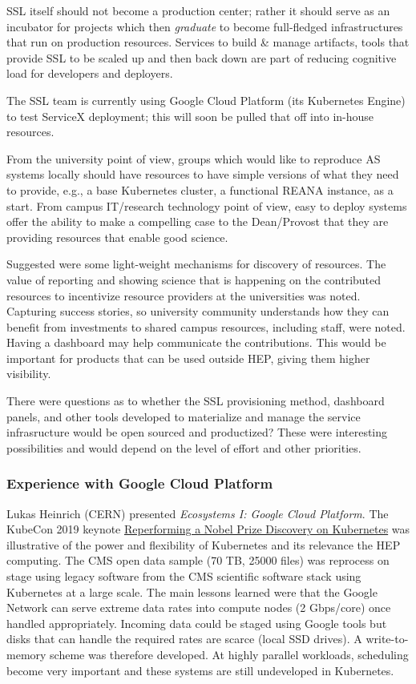 \documentclass[11pt,letterpaper,fleqn]{article}
\begin{document}
SSL itself should not become a production center; rather it should serve as an incubator for projects which then {\it graduate} to become full-fledged infrastructures that run on production resources. Services to build \& manage artifacts, tools that provide SSL to be scaled up and then back down are part of reducing cognitive load for developers and deployers.

The SSL team is currently using Google Cloud Platform (its Kubernetes Engine) to test ServiceX deployment; this will soon be pulled that off into in-house resources.

From the university point of view, groups which would like to reproduce AS systems locally should have resources to have simple versions of what they need to provide, e.g., a base Kubernetes cluster, a functional REANA instance, as a start.  From campus IT/research technology point of view, easy to deploy systems offer the ability to make a compelling case to the Dean/Provost that they are providing resources that enable good science.


Suggested were some light-weight mechanisms for discovery of resources.   The value of reporting and showing science that is happening on the contributed resources to incentivize resource providers at the universities was noted.  Capturing success stories, so university community understands how they can benefit from investments to shared campus resources, including staff, were noted.  Having a dashboard may help communicate the contributions.  This would be important for products that can be used outside HEP, giving them higher visibility.

There were questions as to whether the SSL provisioning method, dashboard panels, and other tools developed to materialize and manage the service infrasructure would be open sourced and productized?  These were interesting possibilities and would depend on the level of effort and other priorities.


\subsubsection{Experience with Google Cloud Platform}

Lukas Heinrich (CERN) presented {\it Ecosystems I: Google Cloud Platform}.  The KubeCon 2019 keynote \href{https://sched.co/MRyv}{Reperforming a Nobel Prize Discovery on Kubernetes} was illustrative of the power and flexibility of Kubernetes and its relevance the HEP computing.  The CMS open data sample (70 TB, 25000 files) was reprocess on stage using legacy software from the CMS scientific software stack using Kubernetes at a large scale.  The main lessons learned were that the Google Network can serve extreme data rates into compute nodes (2 Gbps/core) once handled appropriately. Incoming data could be staged using Google tools but disks that can handle the required rates are scarce (local SSD drives).  A write-to-memory scheme was therefore developed. At highly parallel workloads, scheduling become very important and these systems are still undeveloped in Kubernetes.
\end{document}
